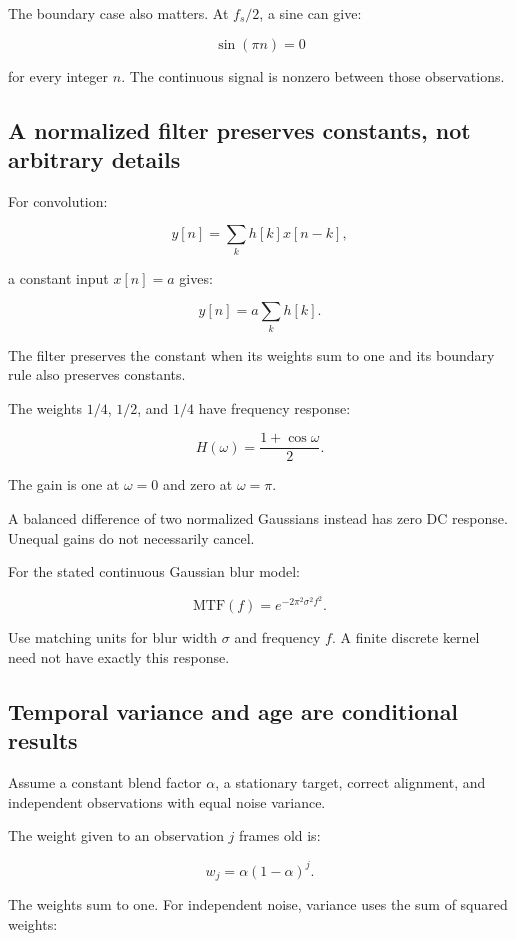 The boundary case also matters. At \(f_s/2\), a sine can give:

\[
\sin(\pi n)=0
\]

for every integer \(n\). The continuous signal is nonzero between those observations.

\subsection{A normalized filter preserves constants, not arbitrary details}\label{04-visual-computing-ii-ch043-a-normalized-filter-preserves-constants-not-arbitrary-details}

For convolution:

\[
y[n]=\sum_k h[k]x[n-k],
\]

a constant input \(x[n]=a\) gives:

\[
y[n]=a\sum_k h[k].
\]

The filter preserves the constant when its weights sum to one and its boundary rule also preserves constants.

The weights \(1/4\), \(1/2\), and \(1/4\) have frequency response:

\[
H(\omega)=\frac{1+\cos\omega}{2}.
\]

The gain is one at \(\omega=0\) and zero at \(\omega=\pi\).

A balanced difference of two normalized Gaussians instead has zero DC response. Unequal gains do not necessarily cancel.

For the stated continuous Gaussian blur model:

\[
\mathrm{MTF}(f)=e^{-2\pi^2\sigma^2f^2}.
\]

Use matching units for blur width \(\sigma\) and frequency \(f\). A finite discrete kernel need not have exactly this response.

\subsection{Temporal variance and age are conditional results}\label{04-visual-computing-ii-ch043-temporal-variance-and-age-are-conditional-results}

Assume a constant blend factor \(\alpha\), a stationary target, correct alignment, and independent observations with equal noise variance.

The weight given to an observation \(j\) frames old is:

\[
w_j=\alpha(1-\alpha)^j.
\]

The weights sum to one. For independent noise, variance uses the sum of squared weights:

